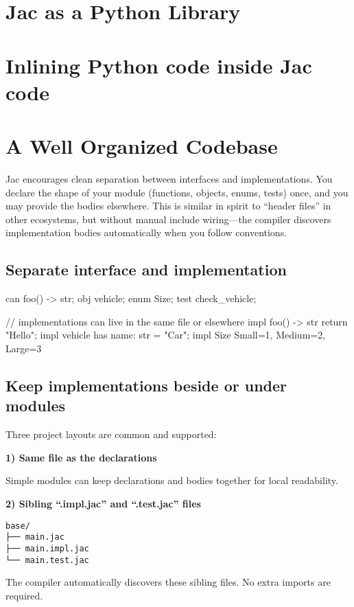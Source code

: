 \section{Jac as a Python Library}


\section{Inlining Python code inside Jac code}


\section{A Well Organized Codebase}
Jac encourages clean separation between interfaces and implementations. You declare the shape of your module (functions, objects, enums, tests) once, and you may provide the bodies elsewhere. This is similar in spirit to ``header files'' in other ecosystems, but without manual include wiring—the compiler discovers implementation bodies automatically when you follow conventions.

\subsection*{Separate interface and implementation}
\begin{jacblock}
can foo() -> str;
obj vehicle;
enum Size;
test check_vehicle;

// implementations can live in the same file or elsewhere
impl foo() -> str { return "Hello"; }
impl vehicle { has name: str = "Car"; }
impl Size { Small=1, Medium=2, Large=3 }
\end{jacblock}

\subsection*{Keep implementations beside or under modules}
Three project layouts are common and supported:

\textbf{1) Same file as the declarations}

Simple modules can keep declarations and bodies together for local readability.

\textbf{2) Sibling ``.impl.jac'' and ``.test.jac'' files}

\begin{lstlisting}[language=shell]
base/
├── main.jac
├── main.impl.jac
└── main.test.jac
\end{lstlisting}

The compiler automatically discovers these sibling files. No extra imports are required.

